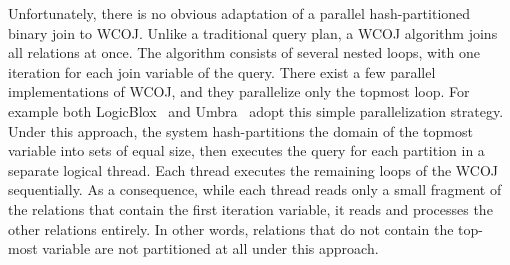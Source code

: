 Unfortunately, there is no obvious adaptation of a parallel 
hash-partitioned binary join to WCOJ.  Unlike a traditional query plan, a WCOJ
algorithm joins all relations at once.  The algorithm consists of
several nested loops, with one iteration for each join variable of the
query.  There exist a few parallel implementations of WCOJ, and they
parallelize only the topmost loop.  For example both
LogicBlox~\cite{DBLP:conf/sigmod/ArefCGKOPVW15} and
Umbra~\cite{DBLP:journals/pvldb/FreitagBSKN20}  adopt this simple
parallelization strategy.  Under this approach, the system
hash-partitions the domain of the topmost variable into sets of equal
size, then executes the query for each partition in a separate logical
thread.  Each thread executes the remaining loops of the WCOJ
sequentially.  As a consequence, while each thread reads only a small
fragment of the relations that contain the first iteration variable,
it reads and processes the other relations entirely.  In other words,
relations that do not contain the top-most variable are not
partitioned at all under this approach.

